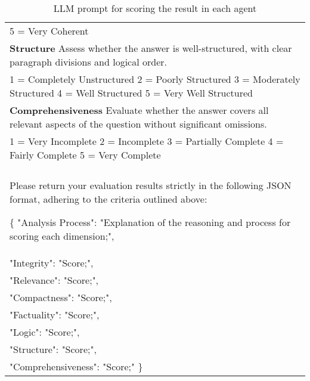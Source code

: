 \documentclass[11pt]{article}
\begin{document}
\begin{table*}[t]
\begin{tabular}{p{\textwidth}}
5 = Very Coherent
\\
\textbf{Structure}
Assess whether the answer is well-structured, with clear paragraph divisions and logical order.\\
1 = Completely Unstructured
2 = Poorly Structured
3 = Moderately Structured
4 = Well Structured
5 = Very Well Structured
\\
\textbf{Comprehensiveness}
Evaluate whether the answer covers all relevant aspects of the question without significant omissions.\\
1 = Very Incomplete
2 = Incomplete
3 = Partially Complete
4 = Fairly Complete
5 = Very Complete
\\
\\
Please return your evaluation results strictly in the following JSON format, adhering to the criteria outlined above:

\{
  "Analysis Process": "Explanation of the reasoning and process for scoring each dimension;",\\
  "Integrity": "Score;",\\
  "Relevance": "Score;",\\
  "Compactness": "Score;",\\
  "Factuality": "Score;",\\
  "Logic": "Score;",\\
  "Structure": "Score;",\\
  "Comprehensiveness": "Score;"
\}
\\
\hline
\end{tabular}
\caption{LLM prompt for scoring the result in each agent}
\label{tab:score-prompt}
\end{table*}
\end{document}
